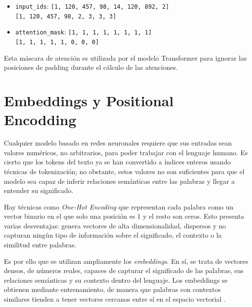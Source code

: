 \documentclass[11pt]{book}
\theoremstyle{plain}
\theoremstyle{definition}
\begin{document}
\begin{itemize}
    \item \texttt{input\_ids}: \texttt{[1, 120, 457, 98, 14, 120, 892, 2]} \\
    \texttt{[1, 120, 457, 98, 2, 3, 3, 3]}
    \item \texttt{attention\_mask}: \texttt{[1, 1, 1, 1, 1, 1, 1, 1]} \\
    \texttt{[1, 1, 1, 1, 1, 0, 0, 0]}
\end{itemize}

Esta máscara de atención es utilizada por el modelo Transformer para ignorar las posiciones de padding durante el cálculo de las atenciones.

\text{\#\#\#\#\#\#\#\#\#\#\#\#\#\#\#\#\#\#\#\#\#\#\#\#\#\#\#\#\#\#\#\#\#}

\section{Embeddings y Positional Encodding}
Cualquier modelo basado en redes neuronales requiere que sus entradas sean valores numéricos, no arbitrarios, para poder trabajar con el lenguaje humano. Es cierto que los tokens del texto ya se han convertido a índices enteros usando técnicas de tokenización; no obstante, estos valores no son suficientes para que el modelo sea capaz de inferir relaciones semánticas entre las palabras y llegar a entender su significado.

Hay técnicas como  \textit{One-Hot Encoding} que representan cada palabra como un vector binario en el que solo una posición es 1 y el resto son ceros. Esto presenta varias desventajas: genera vectores de alta dimensionalidad, dispersos y no capturan ningún tipo de información sobre el significado, el contexto o la similitud entre palabras.

Es por ello que se utilizan ampliamente los \textit{embeddings}. En sí, se trata de vectores densos, de números reales, capaces de capturar el significado de las palabras, sus relaciones semánticas y su contexto dentro del lenguaje. Los embeddings se obtienen mediante entrenamiento, de manera que palabras con contextos similares tienden a tener vectores cercanos entre sí en el espacio vectorial \parencite{geeksforgeeks_embedding}.
\end{document}
